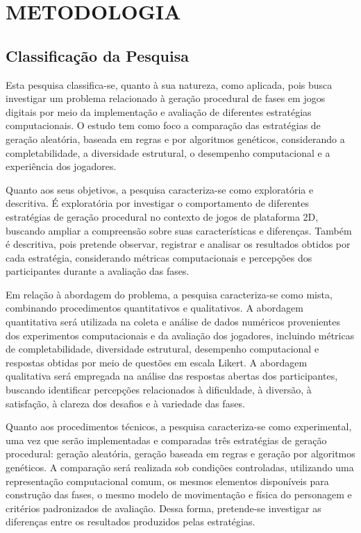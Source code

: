 \chapter{METODOLOGIA}
\label{cap:metodologia}

\section{Classificação da Pesquisa}
\label{sec:classificacao-pesquisa}

Esta pesquisa classifica-se, quanto à sua natureza, como aplicada,
pois busca investigar um problema relacionado à geração procedural 
de fases em jogos digitais por meio da implementação e avaliação 
de diferentes estratégias computacionais. O estudo tem como foco a comparação das 
estratégias de geração aleatória, baseada em regras e por algoritmos genéticos, 
considerando a completabilidade, a diversidade estrutural, o desempenho 
computacional e a experiência dos jogadores.

Quanto aos seus objetivos, a pesquisa caracteriza-se como exploratória 
e descritiva. É exploratória por investigar o comportamento de diferentes 
estratégias de geração procedural no contexto de jogos de plataforma 2D, 
buscando ampliar a compreensão sobre suas características e diferenças. 
Também é descritiva, pois pretende observar, registrar e analisar os resultados 
obtidos por cada estratégia, considerando métricas computacionais e percepções 
dos participantes durante a avaliação das fases.

Em relação à abordagem do problema, a pesquisa caracteriza-se como mista, 
combinando procedimentos quantitativos e qualitativos. A abordagem quantitativa 
será utilizada na coleta e análise de dados numéricos provenientes dos 
experimentos computacionais e da avaliação dos jogadores, incluindo métricas de 
completabilidade, diversidade estrutural, desempenho computacional e respostas 
obtidas por meio de questões em escala Likert. A abordagem qualitativa será 
empregada na análise das respostas abertas dos  participantes, buscando 
identificar percepções relacionados  à dificuldade, à diversão, à satisfação, 
à clareza dos desafios e à variedade das fases.

Quanto aos procedimentos técnicos, a pesquisa caracteriza-se como experimental, 
uma vez que serão implementadas e comparadas três estratégias de geração 
procedural: geração aleatória, geração baseada em regras e geração por 
algoritmos genéticos. A comparação será realizada sob condições controladas, 
utilizando uma representação computacional comum, os mesmos elementos 
disponíveis para construção das fases, o mesmo modelo de movimentação e 
física do personagem e critérios padronizados de avaliação. Dessa forma, 
pretende-se investigar as diferenças entre os resultados produzidos pelas 
estratégias.

